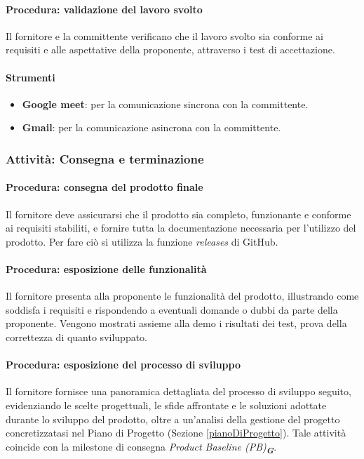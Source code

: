 \documentclass[a4paper,12pt]{article}
\newcommand{\glossario}[1]{\textit{#1}\textsubscript{\textbf{\textit{\textcolor{lightblack}{G}}}}}
\begin{document}
\paragraph{Procedura: validazione del lavoro svolto}
Il fornitore e la committente verificano che il lavoro svolto sia conforme ai
requisiti e alle aspettative della proponente, attraverso i test di
accettazione.

\paragraph{Strumenti}
\begin{itemize}
    \item \textbf{Google meet}: per la comunicazione sincrona con la committente.
    \item \textbf{Gmail}: per la comunicazione asincrona con la committente.
\end{itemize}

\subsubsection{Attività: Consegna e terminazione}
\paragraph{Procedura: consegna del prodotto finale}
Il fornitore deve assicurarsi che il prodotto sia completo, funzionante e
conforme ai requisiti stabiliti, e fornire tutta la documentazione necessaria
per l'utilizzo del prodotto. Per fare ciò si utilizza la funzione \textit{releases} di GitHub.

\paragraph{Procedura: esposizione delle funzionalità}
Il fornitore presenta alla proponente le funzionalità del prodotto, illustrando
come soddisfa i requisiti e rispondendo a eventuali domande o dubbi da parte
della proponente. Vengono mostrati assieme alla demo i risultati dei test, prova della
correttezza di quanto sviluppato.

\paragraph{Procedura: esposizione del processo di sviluppo}
Il fornitore fornisce una panoramica dettagliata del processo di sviluppo
seguito, evidenziando le scelte progettuali, le sfide affrontate e le soluzioni
adottate durante lo sviluppo del prodotto, oltre a un'analisi della gestione
del progetto concretizzatasi nel Piano di Progetto (Sezione
\ref{pianoDiProgetto}). Tale attività coincide con la milestone di consegna
\glossario{Product Baseline (PB)}.
\end{document}
